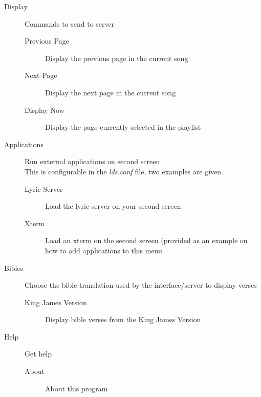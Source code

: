 \documentclass[11pt,twoside]{book}
\begin{document}
\begin{description}
		\item[Display]
		Commands to send to server
		\begin{description}
			\item[Previous Page] Display the previous page in the current song
			\item[Next Page] Display the next page in the current song
			\item[Display Now] Display the page currently selected in the playlist
		\end{description}

		\item[Applications]
		Run external applications on second screen\\
		This is configurable in the \emph{lds.conf} file, two examples are given.
		\begin{description}
			\item[Lyric Server] Load the lyric server on your second screen
			\item[Xterm] Load an xterm on the second screen (provided as an example on how to add applications to this menu
		\end{description}

		\item[Bibles]
		Choose the bible translation used by the interface/server to display verses
		\begin{description}
			\item[King James Version] Display bible verses from the King James Version
		\end{description}

		\item[Help]
		Get help
		\begin{description}
			\item[About] About this program
		\end{description}

	\end{description}
\end{document}
